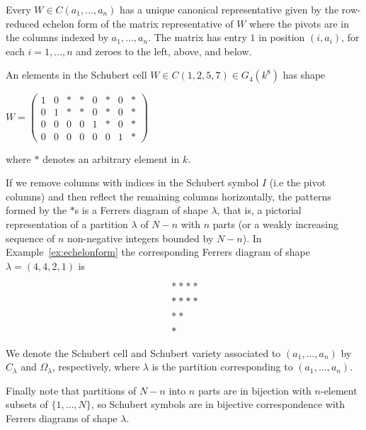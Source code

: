 \documentclass[a4paper,openany]{scrbook}
\begin{document}
Every $W\in C(a_1,\dots ,a_n)$ has a unique canonical representative given by the row-reduced echelon form of the matrix representative of $W$ where the pivots are in the columns indexed by $a_1,\dots ,a_n$. The matrix has entry $1$ in position $(i,a_i)$, for each $i=1,\dots ,n$ and zeroes to the left, above, and below.

\begin{example} \label{ex:echelonform}
An elements in the Schubert cell $W\in C(1,2,5,7) \in G_4(k^{8})$ has shape
\begin{center}
$W = \begin{pmatrix}
  1 & 0 & * & * & 0 & * & 0 & * \\
  0 & 1 & * & * & 0 & * & 0 & * \\
  0 & 0 & 0 & 0 & 1 & * & 0 & * \\
  0 & 0 & 0 & 0 & 0 & 0 & 1 & *
 \end{pmatrix}$
\end{center}  \noindent
where $*$ denotes an arbitrary element in $k$.  
\end{example} \noindent

\begin{remark}
If we remove columns with indices in the Schubert symbol $I$ (i.e the pivot columns) and then reflect the remaining columns horizontally, the patterns formed by the $*$s is a Ferrers diagram of shape $\lambda$, that is, a pictorial representation of a partition $\lambda$ of $N-n$ with $n$ parts (or a weakly increasing sequence of $n$ non-negative integers bounded by $N-n$). In Example~\ref{ex:echelonform} the corresponding Ferrers diagram of shape $\lambda = (4,4,2,1)$ is
\begin{align*}
\displaystyle &**** \\	
	      &**** \\   
	      &**   \\
	      &\hspace{0.08cm} * 
\end{align*} \noindent

We denote the Schubert cell and Schubert variety associated to $(a_1,\dots ,a_n)$ by $C_\lambda$ and $\Omega_\lambda$, respectively, where $\lambda$ is the partition corresponding to $(a_1,\dots ,a_n)$. 

Finally note that partitions of $N-n$ into $n$ parts are in bijection with $n$-element subsets of $\{1,\dots,N\}$, so Schubert symbols are in bijective correspondence with Ferrers diagrams of shape $\lambda$.
\end{remark} \noindent
\end{document}
